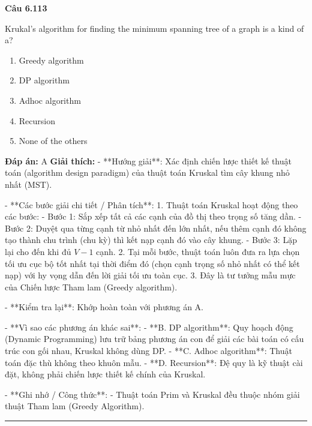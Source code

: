 \documentclass[11pt,a4paper]{article}
\newenvironment{question}[1]{%
  \par\vspace{1em}\noindent\textbf{\large Câu #1}\par\vspace{0.4em}
}{%
  \par\vspace{1em}\hrule\vspace{0.6em}
}
\newenvironment{choices}{%
  \begin{enumerate}[label=\textbf{\Alph*.},leftmargin=2.2em,itemsep=2pt,topsep=3pt]
}{%
  \end{enumerate}
}
\newcommand{\choice}{\item}
\begin{document}
\begin{question}{6.113}
Krukal's algorithm for finding the minimum spanning tree of a graph is a kind of a?
\begin{choices}
\choice Greedy algorithm
\choice DP algorithm
\choice Adhoc algorithm
\choice Recursion
\choice None of the others
\end{choices}
\textbf{Đáp án:} A
\textbf{Giải thích:} - **Hướng giải**:
  Xác định chiến lược thiết kế thuật toán (algorithm design paradigm) của thuật toán Kruskal tìm cây khung nhỏ nhất (MST).

- **Các bước giải chi tiết / Phân tích**:
  1. Thuật toán Kruskal hoạt động theo các bước:
     - Bước 1: Sắp xếp tất cả các cạnh của đồ thị theo trọng số tăng dần.
     - Bước 2: Duyệt qua từng cạnh từ nhỏ nhất đến lớn nhất, nếu thêm cạnh đó không tạo thành chu trình (chu kỳ) thì kết nạp cạnh đó vào cây khung.
     - Bước 3: Lặp lại cho đến khi đủ \(V - 1\) cạnh.
  2. Tại mỗi bước, thuật toán luôn đưa ra lựa chọn tối ưu cục bộ tốt nhất tại thời điểm đó (chọn cạnh trọng số nhỏ nhất có thể kết nạp) với hy vọng dẫn đến lời giải tối ưu toàn cục.
  3. Đây là tư tưởng mẫu mực của Chiến lược Tham lam (Greedy algorithm).

- **Kiểm tra lại**:
  Khớp hoàn toàn với phương án A.

- **Vì sao các phương án khác sai**:
  - **B. DP algorithm**: Quy hoạch động (Dynamic Programming) lưu trữ bảng phương án con để giải các bài toán có cấu trúc con gối nhau, Kruskal không dùng DP.
  - **C. Adhoc algorithm**: Thuật toán đặc thù không theo khuôn mẫu.
  - **D. Recursion**: Đệ quy là kỹ thuật cài đặt, không phải chiến lược thiết kế chính của Kruskal.

- **Ghi nhớ / Công thức**:
  - Thuật toán Prim và Kruskal đều thuộc nhóm giải thuật Tham lam (Greedy Algorithm).
\end{question}
\end{document}
